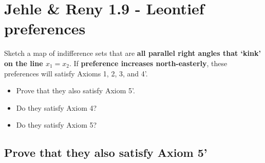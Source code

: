 \documentclass{article}
\begin{document}
\newpage
\section{Jehle \& Reny 1.9 - Leontief preferences}

Sketch a map of indifference sets that are \textbf{all parallel right angles that ‘kink’ on the line $x_1 = x_2$}. If
\textbf{preference increases north-easterly}, these preferences will satisfy Axioms 1, 2, 3, and 4'. 

\begin{itemize}
\item Prove that they also satisfy Axiom 5'. 

\item Do they satisfy Axiom 4? 

\item Do they satisfy Axiom 5?
\end{itemize}


{\centering
{}
\label{fig:1_9}}

\subsection{Prove that they also satisfy Axiom 5'}
\end{document}
